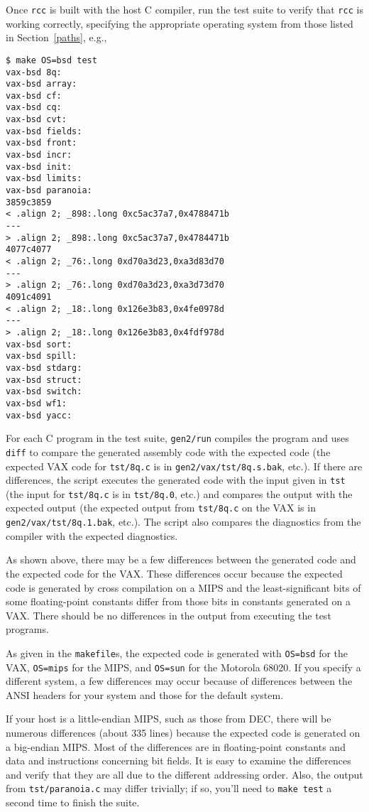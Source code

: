Once \verb|rcc| is built with the host C compiler,
run the test suite to verify that \verb|rcc| is working correctly,
specifying the appropriate operating system from those listed
in Section~\ref{paths}, e.g.,
\begin{verbatim}
$ make OS=bsd test
vax-bsd 8q:
vax-bsd array:
vax-bsd cf:
vax-bsd cq:
vax-bsd cvt:
vax-bsd fields:
vax-bsd front:
vax-bsd incr:
vax-bsd init:
vax-bsd limits:
vax-bsd paranoia:
3859c3859
< .align 2; _898:.long 0xc5ac37a7,0x4788471b
---
> .align 2; _898:.long 0xc5ac37a7,0x4784471b
4077c4077
< .align 2; _76:.long 0xd70a3d23,0xa3d83d70
---
> .align 2; _76:.long 0xd70a3d23,0xa3d73d70
4091c4091
< .align 2; _18:.long 0x126e3b83,0x4fe0978d
---
> .align 2; _18:.long 0x126e3b83,0x4fdf978d
vax-bsd sort:
vax-bsd spill:
vax-bsd stdarg:
vax-bsd struct:
vax-bsd switch:
vax-bsd wf1:
vax-bsd yacc:
\end{verbatim}
For each C program in the test suite,
\verb|gen2/run| compiles the program and uses \verb|diff|
to compare the generated assembly code
with the expected code (the expected VAX code for \verb|tst/8q.c| is
in \verb|gen2/vax/tst/8q.s.bak|, etc.). If there are differences, the script
executes the generated code with the input given in \verb|tst|
(the input for \verb|tst/8q.c| is in \verb|tst/8q.0|, etc.)
and compares the output with the expected output
(the expected output from \verb|tst/8q.c| on the VAX is
in \verb|gen2/vax/tst/8q.1.bak|, etc.). The script also compares the
diagnostics from the compiler with the expected diagnostics.

As shown above, there may be a few differences between the generated code
and the expected code for the VAX.
These differences occur because the expected code is
generated by cross compilation
on a MIPS and the least-significant bits of some floating-point constants
differ from those bits in constants generated on a VAX.
There should be no differences in the output from executing the test programs.

As given in the \verb|makefile|s, the expected code is generated with
\verb|OS=bsd| for the VAX,
\verb|OS=mips| for the MIPS, and
\verb|OS=sun| for the Motorola 68020.
If you specify a different system,
a few differences may occur because of differences between the ANSI headers
for your system and those for the default system.

If your host is a little-endian MIPS, such as those from DEC,
there will be numerous differences (about 335 lines) because the expected code
is generated on a big-endian MIPS. Most of the differences
are in floating-point constants and data and instructions
concerning bit fields. It is easy to examine
the differences and verify that they are all due to the different
addressing order. Also, the output from \verb|tst/paranoia.c|
may differ trivially; if so, you'll need to \verb|make test| a second
time to finish the suite.

